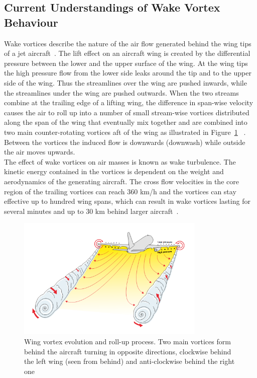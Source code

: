 \subsection{Current Understandings of Wake Vortex Behaviour}
Wake vortices describe the nature of the air flow generated behind the wing tips of a jet aircraft~\cite{doc4444full}.
The lift effect on an aircraft wing is created by the differential pressure between the lower and the upper surface of the wing. 
At the wing tips the high pressure flow from the lower side leaks around the tip and to the upper side of the wing. Thus the streamlines over the wing are pushed inwards, while the streamlines under the wing are pushed outwards. When the two streams combine at the trailing edge of a lifting wing, the difference in span-wise velocity causes the air to roll up into a number of small stream-wise vortices distributed along the span of the wing that eventually mix together and are combined into two main counter-rotating vortices aft of the wing as illustrated in Figure~\ref{fig:vortex_develop} ~\cite{houghton2012aerodynamics,magazine_aibus_safety, Breitsamter2011Feb, gerz_commercial_2002}. Between the vortices the induced flow is downwards (downwash) while outside the air moves upwards.\\
The effect of wake vortices on air masses is known as wake turbulence. 
The kinetic energy contained in the vortices is dependent on the weight and aerodynamics of the generating aircraft. The cross flow velocities in the core region of the trailing vortices can reach $360$ km/h and the vortices can stay effective up to hundred wing spans, which can result in wake vortices lasting for several minutes and up to $30$ km behind larger aircraft~\cite{Breitsamter2011Feb, gerz_commercial_2002}. 
\begin{figure}[h]
    \centering
    \includegraphics[width=0.8\textwidth]{graphics/WakeVortexPlane.png}
    \caption[Wake vortex roll-up process]{Wing vortex evolution and roll-up process. Two main vortices form behind the aircraft turning in opposite directions, clockwise behind the left wing (seen from behind) and anti-clockwise behind the right one~\cite[p.~043]{magazine_aibus_safety}} \label{fig:vortex_develop}
\end{figure}

